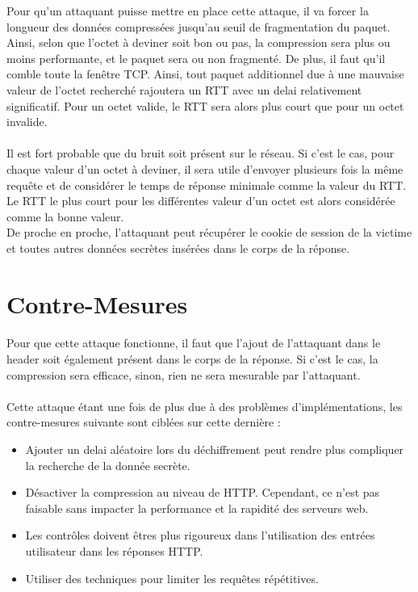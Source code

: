 Pour qu'un attaquant puisse mettre en place cette attaque, il va forcer la longueur des données compressées jusqu'au seuil de fragmentation du paquet. Ainsi, selon que l'octet à deviner soit bon ou pas, la compression sera plus ou moins performante, et le paquet sera ou non fragmenté. De plus, il faut qu'il comble toute la fenêtre TCP. Ainsi, tout paquet additionnel due à une mauvaise valeur de l'octet recherché rajoutera un RTT avec un delai relativement significatif.
Pour un octet valide, le RTT sera alors plus court que pour un octet invalide.

\paragraph{}
Il est fort probable que du bruit soit présent sur le réseau. Si c'est le cas, pour chaque valeur d'un octet à deviner, il sera utile d'envoyer plusieurs fois la même requête et de considérer le temps de réponse minimale comme la valeur du RTT. Le RTT le plus court pour les différentes valeur d'un octet est alors considérée comme la bonne valeur.\\

De proche en proche, l'attaquant peut récupérer le cookie de session de la victime et toutes autres données secrètes insérées dans le corps de la réponse.

\section{Contre-Mesures}
\paragraph{}
Pour que cette attaque fonctionne, il faut que l'ajout de l'attaquant dans le header soit également présent dans le corps de la réponse. Si c'est le cas, la compression sera efficace, sinon, rien ne sera mesurable par l'attaquant.

\paragraph{}
Cette attaque étant une fois de plus due à des problèmes d'implémentations, les contre-mesures suivante sont ciblées sur cette dernière :
\begin{itemize}
  \item Ajouter un delai aléatoire lors du déchiffrement peut rendre plus compliquer la recherche de la donnée secrète.
  \item Désactiver la compression au niveau de HTTP. Cependant, ce n'est pas faisable sans impacter la performance et la rapidité des serveurs web.
  \item Les contrôles doivent êtres plus rigoureux dans l'utilisation des entrées utilisateur dans les réponses HTTP.
  \item Utiliser des techniques pour limiter les requêtes répétitives.
\end{itemize}
